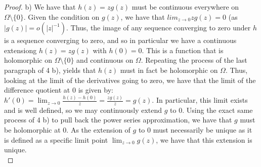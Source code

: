 \documentclass{article}
\begin{document}
\begin{proof}
  b) We have that $h(z) = zg(z)$ must be continuous everywhere on $\Omega \setminus \{0\}$. Given the condition on $g(z)$, we have that $lim_{z \to 0} zg(z) = 0$ (as $|g(z)| = o(|z|^{-1})$. Thus, the image of any sequence converging to zero under $h$ is a sequence converging to zero, and so in particular we have a continuous extensiong $h(z) = zg(z)$ with $h(0) = 0$. This is a function that is holomorphic on $\Omega \setminus \{0\}$ and continuous on $\Omega$. Repeating the process of the last paragraph of 4 b), yields that $h(z)$ must in fact be holomorphic on $\Omega$. Thus, looking at the limit of the derivatives going to zero, we have that the limit of the difference quotient at $0$ is given by: $h'(0) = \lim_{z\to 0}\frac{h(z) - h(0)}{z} = \frac{zg(z)}{z} = g(z)$. In particular, this limit exists and is well defined, so we may continuously extend $g$ to $0$. Using the exact same process of 4 b) to pull back the power series approximation, we have that $g$ must be holomorphic at $0$. As the extension of $g$ to 0 must necessarily be unique as it is defined as a specific limit point $\lim_{z\to 0}g(z)$, we have that this extension is unique.  \\


\end{proof}
\end{document}
